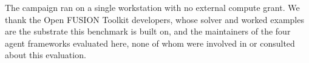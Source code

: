 \documentclass{article}
\begin{document}
\begin{ack}
The campaign ran on a single workstation with no external compute grant. We
thank the Open FUSION Toolkit developers, whose solver and worked examples are
the substrate this benchmark is built on, and the maintainers of the four agent
frameworks evaluated here, none of whom were involved in or consulted about this
evaluation.
\end{ack}

\small


\normalsize

\appendix



\end{document}
